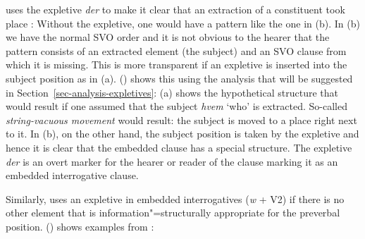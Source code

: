 \noindent
{} uses the expletive \emph{der} to make it clear that an extraction of a constituent took place
\citep[]{MOe2011a}:
\eal
\label{ex-danish-interrogative-expletive}
\zl
Without the expletive, one would have a pattern like the one in (b). In (b) we have the
normal SVO order and it is not obvious to the hearer that the pattern consists of an extracted
element (the subject) and an SVO clause from which it is missing. This is more transparent if an
expletive is inserted into the subject position as in (a). () shows this using the
analysis that will be suggested in Section~\ref{sec-analysis-expletives}: (a) shows the hypothetical
structure that would result if one assumed that the subject \emph{hvem} `who' is
extracted. So-called \emph{string-vacuous movement} would result: the subject is moved to a place
right next to it. In (b), on the other hand, the subject position is taken by the expletive and
hence it is clear that the embedded clause has a special structure. The expletive \emph{der} is an overt marker for
the hearer or reader of the clause marking it as an embedded interrogative clause.
\eal
{}
\zl

\noindent
Similarly,  uses an expletive in embedded interrogatives (\emph{w} + V2) if 
there is no other element that is information"=structurally appropriate for the preverbal position.
() shows examples from \citet[--404]{Prince89a}:

